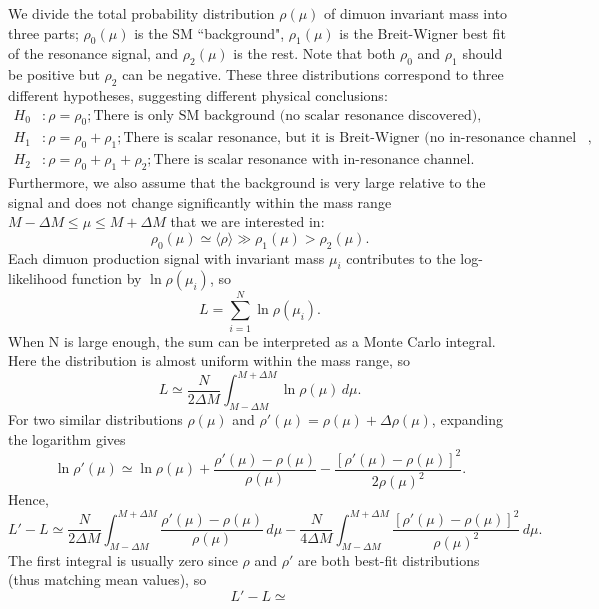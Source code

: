 \documentclass[11pt]{article}
\theoremstyle{definition}
\theoremstyle{remark}
\begin{document}
	We divide the total probability distribution $\rho(\mu)$ of dimuon invariant mass into three parts;
	$\rho_{0}(\mu)$ is the SM ``background", $\rho_{1}(\mu)$ is the Breit-Wigner best fit of the resonance signal, and $\rho_{2}(\mu)$ is the rest.
	Note that both $\rho_{0}$ and $\rho_{1}$ should be positive but $\rho_{2}$ can be negative.
	These three distributions correspond to three different hypotheses, suggesting different physical conclusions:
	\begin{align*}
		H_{0}&:\rho=\rho_{0};\text{There is only SM background (no scalar resonance discovered)},\\
		H_{1}&:\rho=\rho_{0}+\rho_{1};\text{There is scalar resonance, but it is Breit-Wigner (no in-resonance channel detected)},\\
		H_{2}&:\rho=\rho_{0}+\rho_{1}+\rho_{2};\text{There is scalar resonance with in-resonance channel.}
	\end{align*}
	Furthermore, we also assume that the background is very large relative to the signal and does not change significantly within the mass range $M-\Delta M\leq\mu\leq M+\Delta M$ that we are interested in:
	\[\rho_{0}(\mu)\simeq\langle\rho\rangle\gg\rho_{1}(\mu)>\rho_{2}(\mu).\]
	Each dimuon production signal with invariant mass $\mu_{i}$ contributes to the log-likelihood function by $\ln\rho(\mu_{i})$, so
	\[L=\sum_{i=1}^{N}\ln\rho(\mu_{i}).\]
	When N is large enough, the sum can be interpreted as a Monte Carlo integral.
	Here the distribution is almost uniform within the mass range, so
	\[L\simeq\frac{N}{2\Delta M}\int_{M-\Delta M}^{M+\Delta M}\ln\rho(\mu)\,d\mu.\]
	For two similar distributions $\rho(\mu)$ and $\rho'(\mu)=\rho(\mu)+\Delta\rho(\mu)$, expanding the logarithm gives
	\[\ln\rho'(\mu)\simeq\ln\rho(\mu)+\frac{\rho'(\mu)-\rho(\mu)}{\rho(\mu)}-\frac{[\rho'(\mu)-\rho(\mu)]^{2}}{2\rho(\mu)^{2}}.\]
	Hence,
	\[L'-L\simeq\frac{N}{2\Delta M}\int_{M-\Delta M}^{M+\Delta M}\frac{\rho'(\mu)-\rho(\mu)}{\rho(\mu)}\,d\mu-\frac{N}{4\Delta M}\int_{M-\Delta M}^{M+\Delta M}\frac{[\rho'(\mu)-\rho(\mu)]^{2}}{\rho(\mu)^{2}}\,d\mu.\]
	The first integral is usually zero since $\rho$ and $\rho'$ are both best-fit distributions (thus matching mean values), so
	\[L'-L\simeq\]
	
\end{document}
